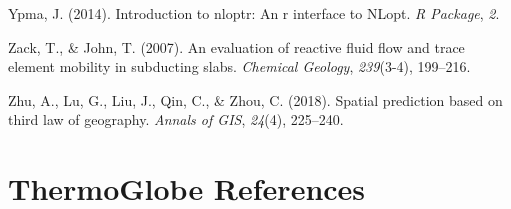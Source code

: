 \begin{CSLReferences}{1}{1}
\leavevmode{}%
Ypma, J. (2014). Introduction to nloptr: An r interface to NLopt. \emph{R Package}, \emph{2}.

\leavevmode{}%
Zack, T., \& John, T. (2007). An evaluation of reactive fluid flow and trace element mobility in subducting slabs. \emph{Chemical Geology}, \emph{239}(3-4), 199--216.

\leavevmode{}%
Zhu, A., Lu, G., Liu, J., Qin, C., \& Zhou, C. (2018). Spatial prediction based on third law of geography. \emph{Annals of GIS}, \emph{24}(4), 225--240.

\end{CSLReferences}

\cleardoublepage

\hypertarget{tglobe}{%
\chapter*{ThermoGlobe References}\label{tglobe}}


